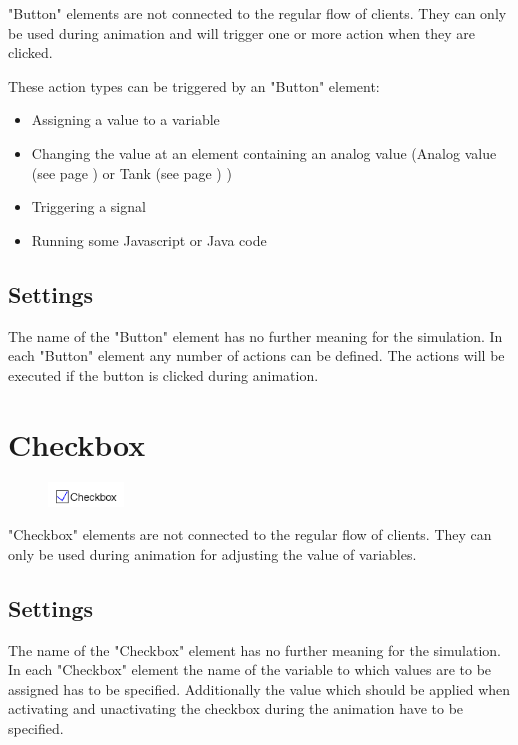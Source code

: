 "Button" elements are not connected to the regular flow of clients.
They can only be used during animation and will trigger one or more
action when they are clicked.

These action types can be triggered by an "Button" element:

\begin{itemize}
  \item Assigning a value to a variable 
  \item Changing the value at an element containing an analog value
  (Analog value (see page \pageref{ref:ModelElementAnalogValue}) or Tank (see page \pageref{ref:ModelElementTank}) )
  \item Triggering a signal 
  \item Running some Javascript or Java code 
\end{itemize}

\subsection*{Settings}

The name of the "Button" element has no further meaning for the simulation.
In each "Button" element any number of actions can be defined. The actions will
be executed if the button is clicked during animation.


\section{Checkbox}
\label{ref:ModelElementInteractiveCheckbox}

\begin{figure}
\vspace{-22pt}
\includegraphics[width=2cm]{imageModelElementInteractiveCheckbox.png}
\vspace{-22pt}
\end{figure}

"Checkbox" elements are not connected to the regular flow of clients.
They can only be used during animation for adjusting the value of
variables.

\subsection*{Settings}

The name of the "Checkbox" element has no further meaning for the simulation.
In each "Checkbox" element the name of the variable to which values are to
be assigned has to be specified. Additionally the value which should be
applied when activating and unactivating the checkbox during the animation
have to be specified.  


